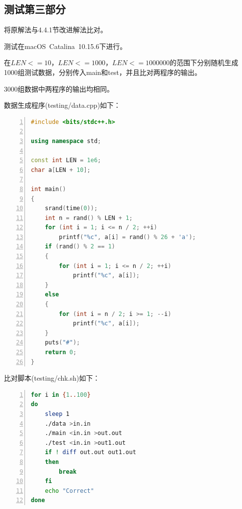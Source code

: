 \documentclass{article}
\begin{document}
\subsection{测试第三部分}

将原解法与4.4.1节改进解法比对。

测试在macOS\ Catalina\ 10.15.6下进行。

在$LEN<=10$，$LEN<=1000$，$LEN<=1000000$的范围下分别随机生成1000组测试数据，分别传入main和test，并且比对两程序的输出。

3000组数据中两程序的输出均相同。

数据生成程序(testing/data.cpp)如下：

\begin{lstlisting}[language={C++},
    numbers=left,
    numberstyle=\tiny\consolas,
    basicstyle=\small\consolas]
#include <bits/stdc++.h>

using namespace std;

const int LEN = 1e6;
char a[LEN + 10];

int main()
{
    srand(time(0));
    int n = rand() % LEN + 1;
    for (int i = 1; i <= n / 2; ++i)
        printf("%c", a[i] = rand() % 26 + 'a');
    if (rand() % 2 == 1)
    {
        for (int i = 1; i <= n / 2; ++i)
            printf("%c", a[i]);
    }
    else
    {
        for (int i = n / 2; i >= 1; --i)
            printf("%c", a[i]);
    }
    puts("#");
    return 0;
}
\end{lstlisting}

比对脚本(testing/chk.sh)如下：

\begin{lstlisting}[language={bash},
    numbers=left,
    numberstyle=\tiny\consolas,
    basicstyle=\small\consolas]
for i in {1..100}
do
    sleep 1
    ./data >in.in
    ./main <in.in >out.out
    ./test <in.in >out1.out
    if ! diff out.out out1.out
    then
        break
    fi
    echo "Correct"
done
\end{lstlisting}
\end{document}
